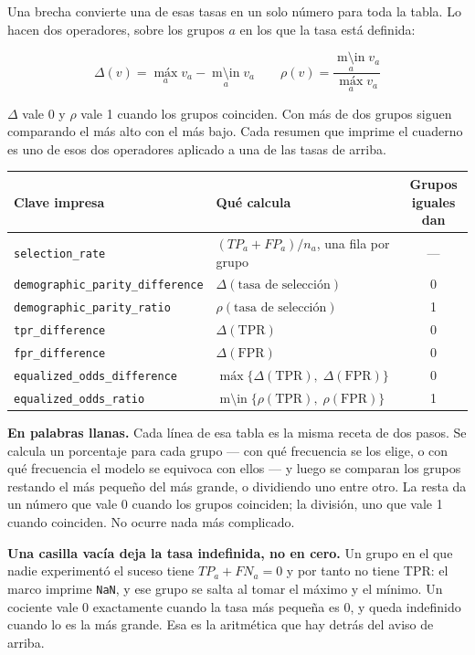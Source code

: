 \documentclass[11pt]{article}
\renewcommand{\max}{\operatorname*{m\text{\'a}x}}%
\renewcommand{\min}{\operatorname*{m\text{\'\i}n}}%
\newcommand{\fn}[1]{\texttt{\small #1}}
\begin{document}
Una brecha convierte una de esas tasas en un solo número para toda la tabla. Lo hacen dos operadores, sobre los grupos \(a\) en los que la tasa está definida:

\[
\Delta(v) = \max_a v_a - \min_a v_a
\qquad
\rho(v) = \frac{\min_a v_a}{\max_a v_a}
\]

\(\Delta\) vale 0 y \(\rho\) vale 1 cuando los grupos coinciden. Con más de dos grupos siguen comparando el más alto con el más bajo. Cada resumen que imprime el cuaderno es uno de esos dos operadores aplicado a una de las tasas de arriba.

\begin{table}[H]
\centering
\small
\begin{tabularx}{\textwidth}{@{}l Y c@{}}
\toprule
Clave impresa & Qué calcula & Grupos iguales dan \\
\midrule
\fn{selection\_rate} & \((TP_a + FP_a) / n_a\), una fila por grupo & --- \\
\fn{demographic\_parity\_difference} & \(\Delta(\text{tasa de selección})\) & 0 \\
\fn{demographic\_parity\_ratio} & \(\rho(\text{tasa de selección})\) & 1 \\
\fn{tpr\_difference} & \(\Delta(\mathrm{TPR})\) & 0 \\
\fn{fpr\_difference} & \(\Delta(\mathrm{FPR})\) & 0 \\
\fn{equalized\_odds\_difference} & \(\max\{\Delta(\mathrm{TPR}),\; \Delta(\mathrm{FPR})\}\) & 0 \\
\fn{equalized\_odds\_ratio} & \(\min\{\rho(\mathrm{TPR}),\; \rho(\mathrm{FPR})\}\) & 1 \\
\bottomrule
\end{tabularx}
\end{table}

\begin{plainwords}
\textbf{En palabras llanas.} Cada línea de esa tabla es la misma receta de dos pasos. Se calcula un porcentaje para cada grupo --- con qué frecuencia se los elige, o con qué frecuencia el modelo se equivoca con ellos --- y luego se comparan los grupos restando el más pequeño del más grande, o dividiendo uno entre otro. La resta da un número que vale 0 cuando los grupos coinciden; la división, uno que vale 1 cuando coinciden. No ocurre nada más complicado.
\end{plainwords}

\begin{careful}
\textbf{Una casilla vacía deja la tasa indefinida, no en cero.} Un grupo en el que nadie experimentó el suceso tiene \(TP_a + FN_a = 0\) y por tanto no tiene TPR: el marco imprime \fn{NaN}, y ese grupo se salta al tomar el máximo y el mínimo. Un cociente vale 0 exactamente cuando la tasa más pequeña es 0, y queda indefinido cuando lo es la más grande. Esa es la aritmética que hay detrás del aviso de arriba.
\end{careful}
\end{document}
